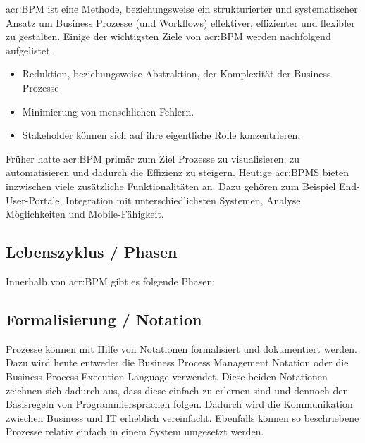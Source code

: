 \gls{acr:BPM} ist eine Methode, beziehungsweise ein strukturierter und systematischer Ansatz um Business Prozesse (und Workflows) effektiver, effizienter und flexibler zu gestalten.
Einige der wichtigsten Ziele von \gls{acr:BPM} werden nachfolgend aufgelistet.

\begin{itemize}
\item Reduktion, beziehungsweise Abstraktion, der Komplexität der Business Prozesse
\item Minimierung von menschlichen Fehlern.
\item Stakeholder können sich auf ihre eigentliche Rolle konzentrieren.
\end{itemize}

Früher hatte \gls{acr:BPM} primär zum Ziel Prozesse zu visualisieren, zu automatisieren und dadurch die Effizienz zu steigern. Heutige \gls{acr:BPMS} bieten inzwischen viele zusätzliche Funktionalitäten an. Dazu gehören zum Beispiel End-User-Portale, Integration mit unterschiedlichsten Systemen, Analyse Möglichkeiten und Mobile-Fähigkeit.


\subsection{Lebenszyklus / Phasen}
Innerhalb von \gls{acr:BPM} gibt es folgende Phasen:

\begin{itemize}
\end{itemize}



\subsection{Formalisierung / Notation }
Prozesse können mit Hilfe von Notationen formalisiert und dokumentiert werden. Dazu wird heute entweder die Business Process Management Notation oder die Business Process Execution Language verwendet. Diese beiden Notationen zeichnen sich dadurch aus, dass diese einfach zu erlernen sind und dennoch den Basisregeln von Programmiersprachen folgen. Dadurch wird die Kommunikation zwischen Business und IT erheblich vereinfacht. Ebenfalls können so beschriebene Prozesse relativ einfach in einem System umgesetzt werden.

